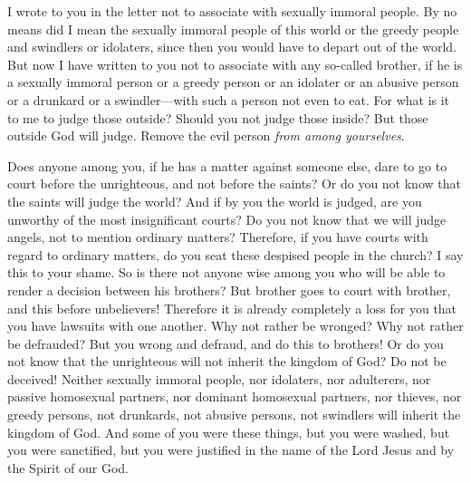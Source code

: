 \begin{biblechapter}
\verse I wrote to you in the letter not to associate with sexually immoral people.
\verse By no means did I mean the sexually immoral people of this world or the greedy people and swindlers or idolaters, since then you would have to depart out of the world.
\verse But now I have written to you not to associate with any so-called brother, if he is a sexually immoral person or a greedy person or an idolater or an abusive person or a drunkard or a swindler—with such a person not even to eat.
\verse For what is it to me to judge those outside? Should you not judge those inside?
\verse But those outside God will judge. Remove the evil person \textit{from among yourselves}.
\end{biblechapter}

\begin{biblechapter} %
 Does anyone among you, if he has a matter against someone else, dare to go to court before the unrighteous, and not before the saints?
\verse Or do you not know that the saints will judge the world? And if by you the world is judged, are you unworthy of the most insignificant courts?
\verse Do you not know that we will judge angels, not to mention ordinary matters?
\verse Therefore, if you have courts with regard to ordinary matters, do you seat these despised people in the church?
\verse I say this to your shame. So is there not anyone wise among you who will be able to render a decision between his brothers?
\verse But brother goes to court with brother, and this before unbelievers!
\verse Therefore it is already completely a loss for you that you have lawsuits with one another. Why not rather be wronged? Why not rather be defrauded?
\verse But you wrong and defraud, and do this to brothers!
\verse Or do you not know that the unrighteous will not inherit the kingdom of God? Do not be deceived! Neither sexually immoral people, nor idolaters, nor adulterers, nor passive homosexual partners, nor dominant homosexual partners,
\verse nor thieves, nor greedy persons, not drunkards, not abusive persons, not swindlers will inherit the kingdom of God.
\verse And some of you were these things, but you were washed, but you were sanctified, but you were justified in the name of the Lord Jesus and by the Spirit of our God.

\end{biblechapter}
